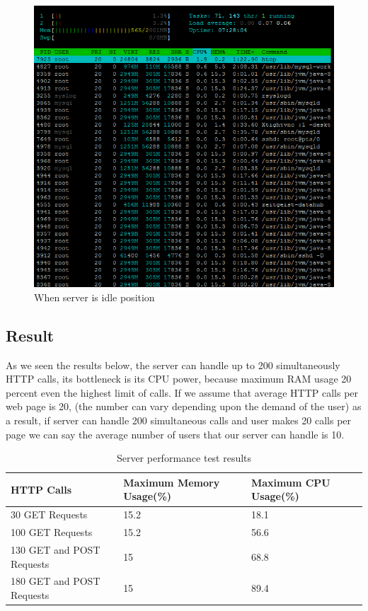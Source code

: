 \begin{figure}[!htbp]
\centering
\includegraphics[width=\textwidth]{projectChapters/images/serveridle.png}
\caption{When server is idle position}
\label{fig:serveridle}
\end{figure}

\subsection{Result}




As we seen the results below, the server can handle up to 200 simultaneously HTTP calls, its bottleneck is its CPU power, because maximum RAM usage 20 percent even the highest limit of calls. If we assume that average HTTP calls per web page is 20, (the number can vary depending upon the demand of the user) as a result, if server can handle 200 simultaneous calls and user makes 20 calls per page we can say the average number of users that our server can handle is 10.

\begin{table}[!ht]
\centering
\caption{Server performance test results}
\label{my-label}
\begin{tabular}{|l|l|l|}
\hline
\textbf{HTTP Calls}                & \textbf{Maximum Memory Usage(\%)} & \textbf{Maximum CPU Usage(\%)} \\ \hline
30 GET Requests           & 15.2                     & 18.1  \\ \hline
100 GET Requests          & 15.2                     & 56.6  \\ \hline
130 GET and POST Requests & 15                       & 68.8  \\ \hline
180 GET and POST Requests & 15                       & 89.4  \\ \hline
\end{tabular}
\end{table}

